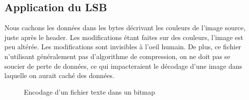 \subsection{Application du LSB}
Nous cachons les données dans les bytes décrivant les couleurs de l'image source, juste après le header.
Les modifications étant faites sur des couleurs, l'image est peu altérée. Les modifications sont invisibles à l'oeil humain.
De plus, ce fichier n'utilisant généralement pas d'algorithme de compression, on ne doit pas se soucier de perte de données, 
ce qui impacteraient le décodage d'une image dans laquelle on aurait caché des données.

\vspace{1.5cm}

\begin{figure}[H]
    \centering
    \hfill
    \caption{Encodage d'un fichier texte dans un bitmap}
\end{figure}